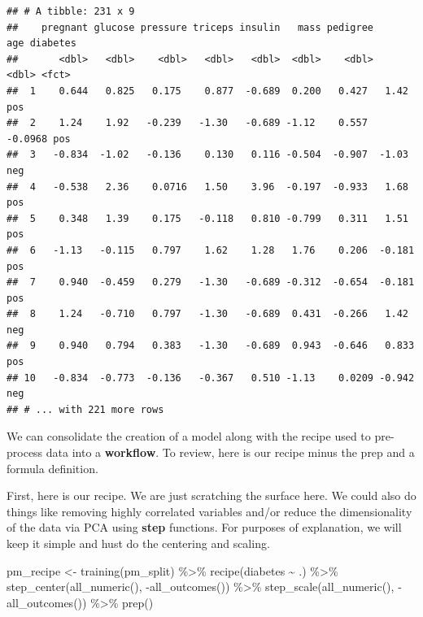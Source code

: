 \documentclass[
]{article}
\newenvironment{Shaded}{\begin{snugshade}}{\end{snugshade}}
\newcommand{\FunctionTok}[1]{\textcolor[rgb]{0.00,0.00,0.00}{#1}}
\newcommand{\NormalTok}[1]{#1}
\newcommand{\OtherTok}[1]{\textcolor[rgb]{0.56,0.35,0.01}{#1}}
\newcommand{\SpecialCharTok}[1]{\textcolor[rgb]{0.00,0.00,0.00}{#1}}
\begin{document}
\begin{verbatim}
## # A tibble: 231 x 9
##    pregnant glucose pressure triceps insulin   mass pedigree     age diabetes
##       <dbl>   <dbl>    <dbl>   <dbl>   <dbl>  <dbl>    <dbl>   <dbl> <fct>   
##  1    0.644   0.825   0.175    0.877  -0.689  0.200   0.427   1.42   pos     
##  2    1.24    1.92   -0.239   -1.30   -0.689 -1.12    0.557  -0.0968 pos     
##  3   -0.834  -1.02   -0.136    0.130   0.116 -0.504  -0.907  -1.03   neg     
##  4   -0.538   2.36    0.0716   1.50    3.96  -0.197  -0.933   1.68   pos     
##  5    0.348   1.39    0.175   -0.118   0.810 -0.799   0.311   1.51   pos     
##  6   -1.13   -0.115   0.797    1.62    1.28   1.76    0.206  -0.181  pos     
##  7    0.940  -0.459   0.279   -1.30   -0.689 -0.312  -0.654  -0.181  pos     
##  8    1.24   -0.710   0.797   -1.30   -0.689  0.431  -0.266   1.42   neg     
##  9    0.940   0.794   0.383   -1.30   -0.689  0.943  -0.646   0.833  pos     
## 10   -0.834  -0.773  -0.136   -0.367   0.510 -1.13    0.0209 -0.942  neg     
## # ... with 221 more rows
\end{verbatim}

We can consolidate the creation of a model along with the recipe used to
pre-process data into a \textbf{workflow}. To review, here is our recipe
minus the prep and a formula definition.

First, here is our recipe. We are just scratching the surface here. We
could also do things like removing highly correlated variables and/or
reduce the dimensionality of the data via PCA using \textbf{step}
functions. For purposes of explanation, we will keep it simple and hust
do the centering and scaling.

\begin{Shaded}
\begin{Highlighting}[]
\NormalTok{pm\_recipe }\OtherTok{\textless{}{-}} \FunctionTok{training}\NormalTok{(pm\_split) }\SpecialCharTok{\%\textgreater{}\%}
  \FunctionTok{recipe}\NormalTok{(diabetes }\SpecialCharTok{\textasciitilde{}}\NormalTok{ .) }\SpecialCharTok{\%\textgreater{}\%}
  \FunctionTok{step\_center}\NormalTok{(}\FunctionTok{all\_numeric}\NormalTok{(), }\SpecialCharTok{{-}}\FunctionTok{all\_outcomes}\NormalTok{()) }\SpecialCharTok{\%\textgreater{}\%}
  \FunctionTok{step\_scale}\NormalTok{(}\FunctionTok{all\_numeric}\NormalTok{(), }\SpecialCharTok{{-}}\FunctionTok{all\_outcomes}\NormalTok{()) }\SpecialCharTok{\%\textgreater{}\%}
  \FunctionTok{prep}\NormalTok{()}
\end{Highlighting}
\end{Shaded}
\end{document}
